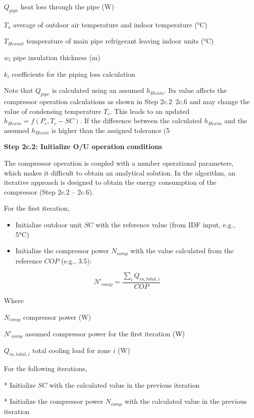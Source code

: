 $Q_{pipe}$ 	heat loss through the pipe (W)

$T_a$ 	average of outdoor air temperature and indoor temperature (°C)

$T_{Hexout}$	temperature of main pipe refrigerant leaving indoor units (°C) 

$w_i$	pipe insulation thickness (m) 

$k_i$	coefficients for the piping loss calculation  

Note that $Q_{pipe}$ is calculated using an assumed $h_{Hexin}$. Its value affects the compressor operation calculations as shown in Step 2c.2~2c.6 and may change the value of condensing temperature $T_c$. This leads to an updated $h_{Hexin}=f(P_c,T_c-SC)$. If the difference between the calculated $h_{Hexin}$ and the assumed $h_{Hexin}$ is higher than the assigned tolerance (5%

\textbf{Step 2c.2: Initialize O/U operation conditions} 

The compressor operation is coupled with a number operational parameters, which makes it difficult to obtain an analytical solution. In the algorithm, an iterative approach is designed to obtain the energy consumption of the compressor (Step 2c.2 – 2c.6).

For the first iteration, 

\begin{itemize}
  \item
    Initialize outdoor unit $SC$ with the reference value (from IDF input, e.g., 5°C)
  \item
    Initialize the compressor power $N_{comp}$ with the value calculated from the reference $COP$ (e.g., 3.5):
\end{itemize}

\begin{equation}N'_{comp}=\frac{\sum_iQ_{in,total,i}}{COP}\end{equation}

Where

$N_{comp}$	compressor power (W)

$N'_{comp}$	assumed compressor power for the first iteration (W)

$Q_{in,total,i}$	total cooling load for zone $i$ (W)

For the following iterations,

* Initialize $SC$ with the calculated value in the previous iteration  

* Initialize the compressor power $N_{comp}$ with the calculated value in the previous iteration

